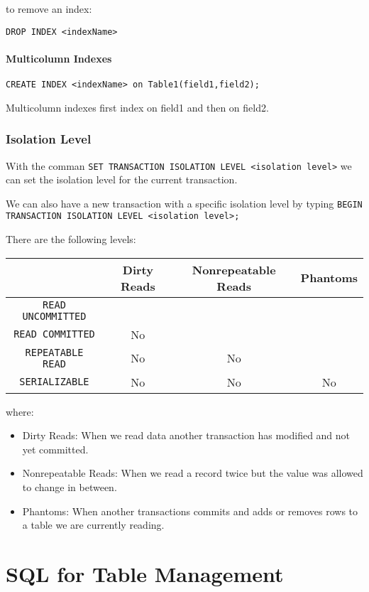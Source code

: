 \documentclass{sciposter}
\renewcommand{\t}[1]{\texttt{#1}}
\begin{document}
\begin{multicols}{3}
to remove an index:

\t{DROP INDEX <indexName>}

\subsection*{Multicolumn Indexes}

\t{CREATE INDEX <indexName> on Table1(field1,field2);}

Multicolumn indexes first index on field1 and then on field2.





\section*{Isolation Level}

With the comman \texttt{SET TRANSACTION ISOLATION LEVEL <isolation level>} we can set the isolation level for the current transaction.

We can also have a new transaction with a specific isolation level by typing \texttt{BEGIN TRANSACTION ISOLATION LEVEL <isolation level>;}




There are the following levels:

\begin{tabular}{|c|c|c|c|}
	\hline
	& Dirty Reads & Nonrepeatable Reads & Phantoms \\
	\hline
	\texttt{READ UNCOMMITTED}&  &  &  \\
	\hline
	\texttt{READ COMMITTED}& No &  &  \\
	\hline
	\texttt{REPEATABLE READ}& No & No &  \\
	\hline
	\texttt{SERIALIZABLE}& No & No & No \\
	\hline
\end{tabular}


where:

\begin{itemize}
	\item Dirty Reads: When we read data another transaction has modified and not yet committed.
	\item Nonrepeatable Reads: When we read a record twice but the value was allowed to change in between.
	\item Phantoms: When another transactions commits and adds or removes rows to a table we are currently reading. 
\end{itemize}


\part{SQL for Table Management}


\end{multicols}
\end{document}
